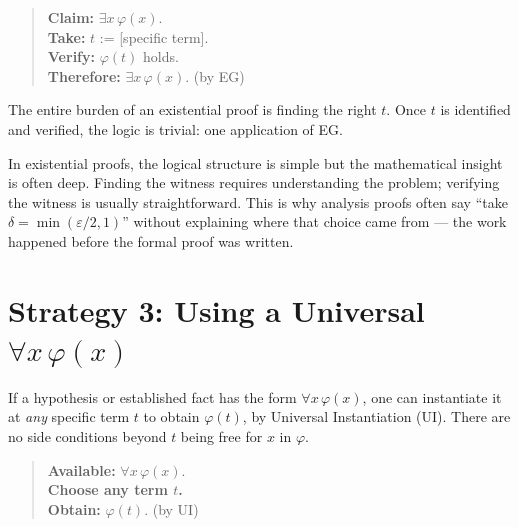 \begin{quote}
\textbf{Claim:} $\exists x\,\varphi(x)$.\\
\textbf{Take:} $t$ := [specific term].\\
\textbf{Verify:} $\varphi(t)$ holds. \\
\textbf{Therefore:} $\exists x\,\varphi(x)$. \quad (by EG)
\end{quote}

\begin{exposition}
The entire burden of an existential proof is finding the right $t$. Once $t$
is identified and verified, the logic is trivial: one application of EG.
\end{exposition}

\begin{remark*}
In existential proofs, the logical structure is simple but the mathematical
insight is often deep. Finding the witness requires understanding the problem;
verifying the witness is usually straightforward. This is why analysis proofs
often say ``take $\delta = \min(\varepsilon/2, 1)$'' without explaining where
that choice came from --- the work happened before the formal proof was written.
\end{remark*}


\section*{\texorpdfstring{Strategy 3: Using a Universal $\forall x\,\varphi(x)$}{Strategy 3: Using a Universal forall x phi(x)}}

\begin{exposition}
If a hypothesis or established fact has the form $\forall x\,\varphi(x)$, one
can instantiate it at \emph{any} specific term $t$ to obtain $\varphi(t)$, by
Universal Instantiation (UI). There are no side conditions beyond $t$ being
free for $x$ in $\varphi$.
\end{exposition}

\begin{quote}
\textbf{Available:} $\forall x\,\varphi(x)$.\\
\textbf{Choose any term $t$.}\\
\textbf{Obtain:} $\varphi(t)$. \quad (by UI)
\end{quote}

